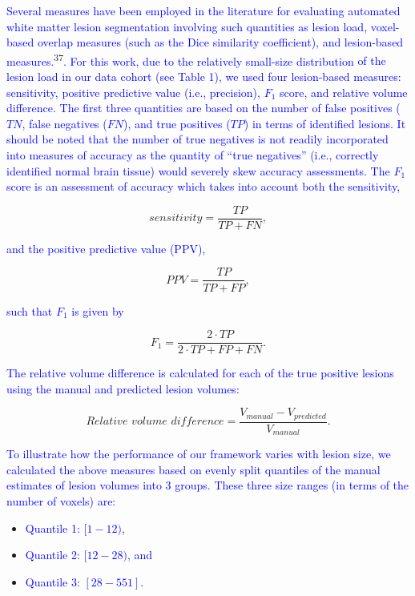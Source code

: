 \documentclass[11pt,]{article}
\begin{document}
\textcolor{blue}{Several measures have been employed in the literature for evaluating
automated white matter lesion segmentation involving such quantities as lesion load,
voxel-based overlap measures (such as the Dice similarity coefficient), and lesion-based measures.}\textsuperscript{37}\textcolor{blue}{.  For this work, due to the relatively small-size distribution}
\textcolor{blue}{of the lesion load in our data cohort (see Table 1), we used
four lesion-based measures:  sensitivity, positive predictive value (i.e., precision), $F_1$ score, and relative volume difference.  The first three quantities are based on the number of false positives ($TN$, false negatives ($FN$), and true positives ($TP$) in terms of identified lesions.  It should be noted that the number of true negatives is not readily
incorporated into measures of accuracy as the quantity of ``true negatives'' (i.e., correctly identified normal brain tissue) would severely skew accuracy assessments. The $F_1$ score is an assessment of accuracy which takes into account both the sensitivity,}

\[ sensitivity =  \frac{ TP }{TP + FN}, \]

\textcolor{blue}{and the positive predictive value (PPV),}

\[ PPV =  \frac{ TP }{TP + FP}, \]

\textcolor{blue}{such that $F_1$ is given by}

\[ F_1 =  \frac{ 2 \cdot TP }{ 2 \cdot TP + FP + FN}. \]

\textcolor{blue}{The relative volume difference is calculated for each of the true positive lesions using
the manual and predicted lesion volumes:}

\[ Relative\,\,volume\,\,difference = \frac{V_{manual} - V_{predicted}}{V_{manual}}. \]

\textcolor{blue}{To illustrate how the performance of our framework varies with lesion size, we calculated
the above measures based on evenly split quantiles of the manual estimates of lesion volumes into 3 groups.  These three size ranges (in terms of the number of voxels) are:}

\begin{itemize}
\item
  \textcolor{blue}{Quantile 1: $[1-12)$,}
\item
  \textcolor{blue}{Quantile 2: $[12-28)$, and}
\item
  \textcolor{blue}{Quantile 3: $[28-551]$}.
\end{itemize}
\end{document}
